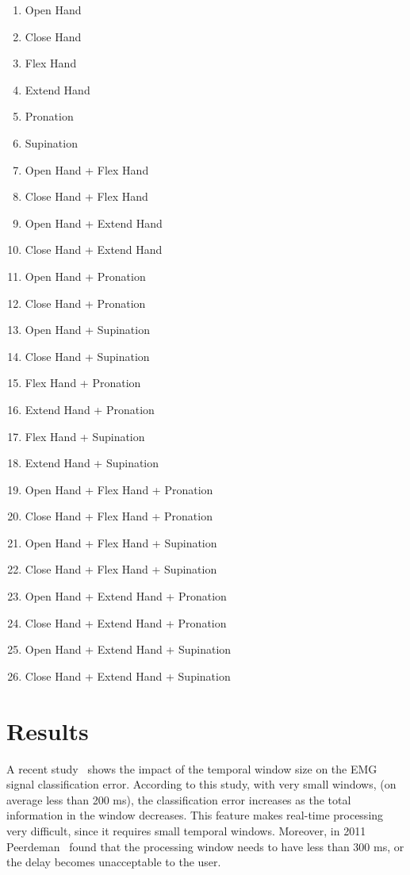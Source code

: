 \documentclass[letterpaper, 10 pt, conference]{ieeeconf}  %
\begin{document}
\begin{enumerate}
    \item Open Hand
    \item Close Hand
    \item Flex Hand
    \item Extend Hand
    \item Pronation
    \item Supination
    \item Open Hand + Flex Hand
    \item Close Hand + Flex Hand
    \item Open Hand + Extend Hand
    \item Close Hand + Extend Hand
    \item Open Hand + Pronation
    \item Close Hand + Pronation
    \item Open Hand + Supination
    \item Close Hand + Supination
    \item Flex Hand + Pronation
    \item Extend Hand + Pronation
    \item Flex Hand + Supination
    \item Extend Hand + Supination
    \item Open Hand + Flex Hand + Pronation
    \item Close Hand + Flex Hand + Pronation
    \item Open Hand + Flex Hand + Supination
    \item Close Hand + Flex Hand + Supination
    \item Open Hand + Extend Hand + Pronation
    \item Close Hand + Extend Hand + Pronation
    \item Open Hand + Extend Hand + Supination
    \item Close Hand + Extend Hand + Supination
\end{enumerate}

\section{Results}

A recent study~\cite{c14} shows the impact of the temporal window size on the EMG signal classification error. According to this study, with very small windows, (on average less than 200 ms), the classification error increases as the total information in the window decreases. This feature makes real-time processing very difficult, since it requires small temporal windows. Moreover, in 2011 Peerdeman~\cite{c15} found that the processing window needs to have less than 300 ms, or the delay becomes unacceptable to the user.
\end{document}
